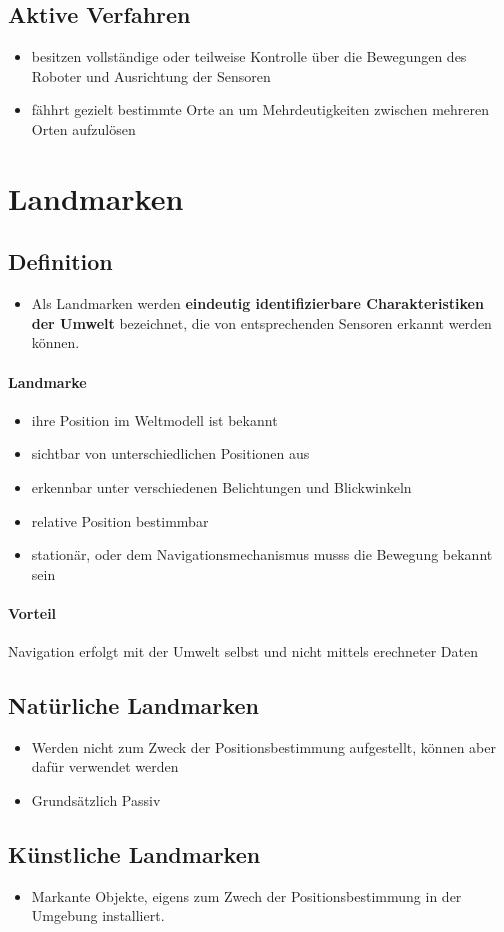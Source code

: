 \subsection{Aktive Verfahren}
\begin{itemize}
	\item besitzen vollständige oder teilweise Kontrolle über die Bewegungen des Roboter und Ausrichtung der Sensoren
	\item fähhrt gezielt bestimmte Orte an um Mehrdeutigkeiten zwischen mehreren Orten aufzulösen
\end{itemize}
\section{Landmarken}
\subsection{Definition}
\begin{itemize}
	\item Als Landmarken werden \textbf{eindeutig identifizierbare Charakteristiken der Umwelt} bezeichnet, die von entsprechenden Sensoren erkannt werden können.
\end{itemize}
\paragraph{Landmarke}
\begin{itemize}
	\item ihre Position im Weltmodell ist bekannt
	\item sichtbar von unterschiedlichen Positionen aus
	\item erkennbar unter verschiedenen Belichtungen und Blickwinkeln
	\item relative Position bestimmbar
	\item stationär, oder dem Navigationsmechanismus musss die Bewegung bekannt sein
\end{itemize}
\paragraph{Vorteil} Navigation erfolgt mit der Umwelt selbst und nicht mittels erechneter Daten
\subsection{Natürliche Landmarken}
\begin{itemize}
	\item Werden nicht zum Zweck der Positionsbestimmung aufgestellt, können aber dafür verwendet werden
	\item Grundsätzlich Passiv
\end{itemize}
\subsection{Künstliche Landmarken}
\begin{itemize}
	\item Markante Objekte, eigens zum Zwech der Positionsbestimmung in der Umgebung installiert.
\end{itemize}
